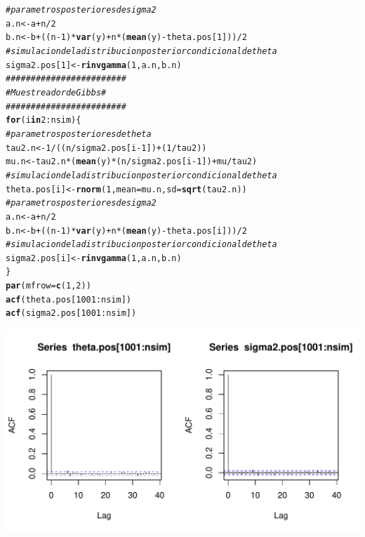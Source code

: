 \documentclass[10pt,openright]{book}\usepackage[]{graphicx}\usepackage[]{color}
\makeatletter
\def\maxwidth{ %
  \ifdim\Gin@nat@width>\linewidth
    \linewidth
  \else
    \Gin@nat@width
  \fi
}
\newcommand{\hlnum}[1]{\textcolor[rgb]{0.686,0.059,0.569}{#1}}%
\newcommand{\hlcom}[1]{\textcolor[rgb]{0.678,0.584,0.686}{\textit{#1}}}%
\newcommand{\hlopt}[1]{\textcolor[rgb]{0,0,0}{#1}}%
\newcommand{\hlstd}[1]{\textcolor[rgb]{0.345,0.345,0.345}{#1}}%
\newcommand{\hlkwa}[1]{\textcolor[rgb]{0.161,0.373,0.58}{\textbf{#1}}}%
\newcommand{\hlkwb}[1]{\textcolor[rgb]{0.69,0.353,0.396}{#1}}%
\newcommand{\hlkwc}[1]{\textcolor[rgb]{0.333,0.667,0.333}{#1}}%
\newcommand{\hlkwd}[1]{\textcolor[rgb]{0.737,0.353,0.396}{\textbf{#1}}}%
\newenvironment{kframe}{%
 \def\at@end@of@kframe{}%
 \ifinner\ifhmode%
  \def\at@end@of@kframe{\end{minipage}}%
  \begin{minipage}{\columnwidth}%
 \fi\fi%
 \def\FrameCommand##1{\hskip\@totalleftmargin \hskip-\fboxsep
 \colorbox{shadecolor}{##1}\hskip-\fboxsep
     \hskip-\linewidth \hskip-\@totalleftmargin \hskip\columnwidth}%
 \MakeFramed {\advance\hsize-\width
   \@totalleftmargin\z@ \linewidth\hsize
   \@setminipage}}%
 {\par\unskip\endMakeFramed%
 \at@end@of@kframe}
\newenvironment{knitrout}{}{} %
\makeatother
\begin{document}
\begin{Eje}
\begin{knitrout}
\begin{kframe}
\begin{alltt}
\hlcom{#parametros posteriores de sigma2	}
\hlstd{a.n} \hlkwb{<-} \hlstd{a}\hlopt{+}\hlstd{n}\hlopt{/}\hlnum{2}
\hlstd{b.n} \hlkwb{<-} \hlstd{b}\hlopt{+}\hlstd{((n}\hlopt{-}\hlnum{1}\hlstd{)}\hlopt{*}\hlkwd{var}\hlstd{(y)}\hlopt{+}\hlstd{n}\hlopt{*}\hlstd{(}\hlkwd{mean}\hlstd{(y)}\hlopt{-}\hlstd{theta.pos[}\hlnum{1}\hlstd{]))}\hlopt{/}\hlnum{2}
\hlcom{#simulacion de la distribucion posterior condicional de theta}
\hlstd{sigma2.pos[}\hlnum{1}\hlstd{]} \hlkwb{<-} \hlkwd{rinvgamma}\hlstd{(}\hlnum{1}\hlstd{, a.n, b.n)}
\hlcom{########################}
\hlcom{# Muestreador de Gibbs #}
\hlcom{########################}
\hlkwa{for}\hlstd{(i} \hlkwa{in} \hlnum{2}\hlopt{:}\hlstd{nsim)\{}
  \hlcom{#parametros posteriores de theta	}
  \hlstd{tau2.n} \hlkwb{<-} \hlnum{1} \hlopt{/} \hlstd{((n}\hlopt{/}\hlstd{sigma2.pos[i}\hlopt{-}\hlnum{1}\hlstd{])}\hlopt{+}\hlstd{(}\hlnum{1}\hlopt{/}\hlstd{tau2))}
  \hlstd{mu.n} \hlkwb{<-} \hlstd{tau2.n} \hlopt{*} \hlstd{(}\hlkwd{mean}\hlstd{(y)} \hlopt{*} \hlstd{(n}\hlopt{/}\hlstd{sigma2.pos[i}\hlopt{-}\hlnum{1}\hlstd{])}\hlopt{+}\hlstd{mu}\hlopt{/}\hlstd{tau2)}
  \hlcom{#simulacion de la distribucion posterior condicional de theta}
  \hlstd{theta.pos[i]} \hlkwb{<-} \hlkwd{rnorm}\hlstd{(}\hlnum{1}\hlstd{,} \hlkwc{mean}\hlstd{=mu.n,} \hlkwc{sd}\hlstd{=}\hlkwd{sqrt}\hlstd{(tau2.n))}
  \hlcom{#parametros posteriores de sigma2	}
  \hlstd{a.n} \hlkwb{<-} \hlstd{a} \hlopt{+} \hlstd{n}\hlopt{/}\hlnum{2}
  \hlstd{b.n} \hlkwb{<-} \hlstd{b} \hlopt{+} \hlstd{((n}\hlopt{-}\hlnum{1}\hlstd{)} \hlopt{*} \hlkwd{var}\hlstd{(y)} \hlopt{+} \hlstd{n} \hlopt{*} \hlstd{(}\hlkwd{mean}\hlstd{(y)}\hlopt{-}\hlstd{theta.pos[i]))} \hlopt{/} \hlnum{2}
  \hlcom{#simulacion de la distribucion posterior condicional de theta}
  \hlstd{sigma2.pos[i]} \hlkwb{<-} \hlkwd{rinvgamma}\hlstd{(}\hlnum{1}\hlstd{, a.n, b.n)}
\hlstd{\}}
\hlkwd{par}\hlstd{(}\hlkwc{mfrow}\hlstd{=}\hlkwd{c}\hlstd{(}\hlnum{1}\hlstd{,}\hlnum{2}\hlstd{))}
\hlkwd{acf}\hlstd{(theta.pos[}\hlnum{1001}\hlopt{:}\hlstd{nsim])}
\hlkwd{acf}\hlstd{(sigma2.pos[}\hlnum{1001}\hlopt{:}\hlstd{nsim])}
\end{alltt}
\end{kframe}
\includegraphics[width=\maxwidth]{figure/unnamed-chunk-34-1} 


\end{knitrout}
\end{Eje}
\end{document}
